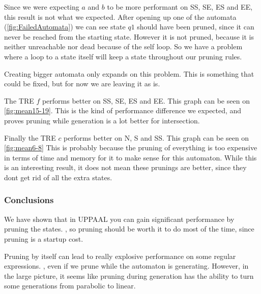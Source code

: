 \resizebox{\columnwidth}{!}{
    
}
\label{fig:mean3-5}

Since we were expecting $a$ and $b$ to be more performant on SS, SE, ES and EE, this result is not what we expected.
After opening up one of the automata (\cref{fig:FailedAutomata}) we can see state $q1$ should have been pruned, since it can never be reached from the starting state.
However it is not pruned, because it is neither unreachable nor dead because of the self loop.
So we have a problem where a loop to a state itself will keep a state throughout our pruning rules.



Creating bigger automata only expands on this problem. This is something that could be fixed, but for now we are leaving it as is.

The TRE $f$ performs better on SS, SE, ES and EE.
This graph can be seen on \cref{fig:mean15-19}.
This is the kind of performance difference we expected, and proves pruning while generation is a lot better for intersection.

\resizebox{\columnwidth}{!}{
    
}

\resizebox{\columnwidth}{!}{
    
}
\label{fig:mean15-19}

Finally the TRE $c$ performs better on N, S and SS.
This graph can be seen on \cref{fig:mean6-8}
This is probably because the pruning of everything is too expensive in terms of time and memory for it to make sense for this automaton.
While this is an interesting result, it does not mean these prunings are better, since they dont get rid of all the extra states.

\resizebox{\columnwidth}{!}{
    
}

\resizebox{\columnwidth}{!}{
    
}
\label{fig:mean6-8}

\subsubsection{Conclusions}
We have shown that in UPPAAL you can gain significant performance by pruning the states.
, so pruning should be worth it to do most of the time, since pruning is a startup cost.

Pruning by itself can lead to really explosive performance on some regular expressions.
, even if we prune while the automaton is generating.
However, in the large picture, it seems like pruning during generation has the ability to turn some generations from parabolic to linear.
